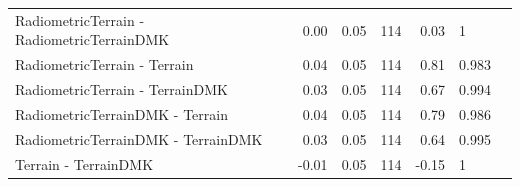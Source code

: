 \documentclass[soil, manuscript]{copernicus}
\begin{document}
\begin{table}[h]
\begin{tabular}[t]{lrrrrll}
RadiometricTerrain - RadiometricTerrainDMK & 0.00 & 0.05 & 114 & 0.03 & 1 & \\
RadiometricTerrain - Terrain & 0.04 & 0.05 & 114 & 0.81 & 0.983 & \\
RadiometricTerrain - TerrainDMK & 0.03 & 0.05 & 114 & 0.67 & 0.994 & \\
RadiometricTerrainDMK - Terrain & 0.04 & 0.05 & 114 & 0.79 & 0.986 & \\
RadiometricTerrainDMK - TerrainDMK & 0.03 & 0.05 & 114 & 0.64 & 0.995 & \\
Terrain - TerrainDMK & -0.01 & 0.05 & 114 & -0.15 & 1 & \\
\hline
\end{tabular}
\end{table}
\clearpage

\begin{table}[h]


\end{table}
\end{document}
